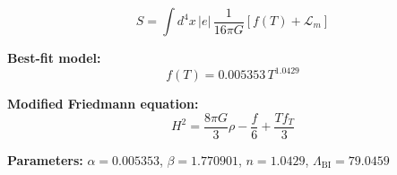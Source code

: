
\begin{equation}
  S = \int d^4x \, |e| \, \frac{1}{16\pi G} \left[ f(T) + \mathcal{L}_m \right]
\end{equation}

\textbf{Best-fit model:}
\begin{equation}
  f(T) = 0.005353 \, T^{1.0429}
\end{equation}

\textbf{Modified Friedmann equation:}
\begin{equation}
  H^2 = \frac{8\pi G}{3} \rho - \frac{f}{6} + \frac{T f_T}{3}
\end{equation}

\textbf{Parameters:}
$\alpha = 0.005353$, \quad
$\beta = 1.770901$, \quad
$n = 1.0429$, \quad
$\Lambda_{\text{BI}} = 79.0459$